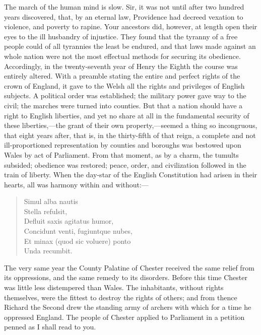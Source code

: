 The march of the human mind is slow. Sir, it was not until after two hundred years discovered, that, by an eternal law, Providence had decreed vexation to violence, and poverty to rapine. Your ancestors did, however, at length open their eyes to the ill husbandry of injustice. They found that the tyranny of a free people could of all tyrannies the least be endured, and that laws made against an whole nation were not the most effectual methods for securing its obedience. Accordingly, in the twenty-seventh year of Henry the Eighth the course was entirely altered. With a preamble stating the entire and perfect rights of the crown of England, it gave to the Welsh all the rights and privileges of English subjects. A political order was established; the military power gave way to the civil; the marches were turned into counties. But that a nation should have a right to English liberties, and yet no share at all in the fundamental security of these liberties,—the grant of their own property,—seemed a thing so incongruous, that eight years after, that is, in the thirty-fifth of that reign, a complete and not ill-proportioned representation by counties and boroughs was bestowed upon Wales by act of Parliament. From that moment, as by a charm, the tumults subsided; obedience was restored; peace, order, and civilization followed in the train of liberty. When the day-star of the English Constitution had arisen in their hearts, all was harmony within and without:—

\begin{verse}
Simul alba nautis \\
Stella refulsit, \\
Defluit saxis agitatus humor, \\
Concidunt venti, fugiuntque nubes, \\
Et minax (quod sic voluere) ponto \\
Unda recumbit.
\end{verse}

The very same year the County Palatine of Chester received the same relief from its oppressions, and the same remedy to its disorders. Before this time Chester was little less distempered than Wales. The inhabitants, without rights themselves, were the fittest to destroy the rights of others; and from thence Richard the Second drew the standing army of archers with which for a time he oppressed England. The people of Chester applied to Parliament in a petition penned as I shall read to you.

